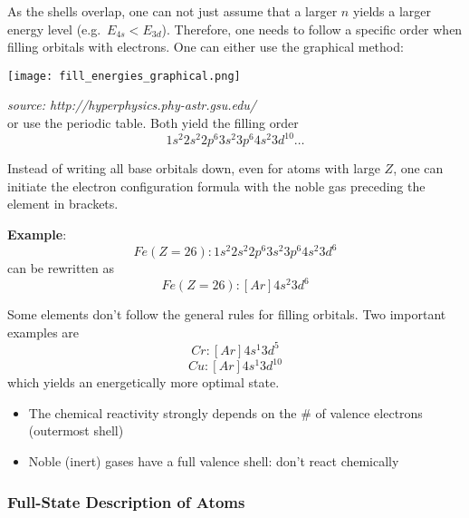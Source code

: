 
As the shells overlap, one can not just assume that a larger $n$ yields a larger energy level (e.g.\ $E_{4s}<E_{3d}$). Therefore, one needs to follow a specific order when filling orbitals with electrons. One can either use the graphical method:
\begin{center}
    \texttt{[image: fill\_energies\_graphical.png]}
\end{center}
\textit{source: http://hyperphysics.phy-astr.gsu.edu/}\\
or use the periodic table. Both yield the filling order
\begin{equation*}
    1s^2 2s^2 2p^6 3s^2 3p^6 4s^2 3d^{10}\dots
\end{equation*}


Instead of writing all base orbitals down, even for atoms with large $Z$, one can initiate the electron configuration formula with the noble gas preceding the element in brackets.

\newpar{}
\textbf{Example}:
\begin{equation*}
    Fe(Z=26): 1s^2 2s^2 2p^6 3s^2 3p^6 4s^2 3d^6
\end{equation*}
can be rewritten as
\begin{equation*}
    Fe(Z=26): \left[Ar\right]4s^2 3d^6
\end{equation*}


Some elements don't follow the general rules for filling orbitals. Two important examples are
\begin{equation*}
    Cr: \left[Ar\right]4s^1 3d^5
\end{equation*}
\begin{equation*}
    Cu: \left[Ar\right]4s^1 3d^{10}
\end{equation*}
which yields an energetically more optimal state.


\begin{itemize}
    \item The chemical reactivity strongly depends on the \# of valence electrons (outermost shell)
    \item Noble (inert) gases have a full valence shell: don't react chemically
\end{itemize}

\subsubsection{Full-State Description of Atoms}


